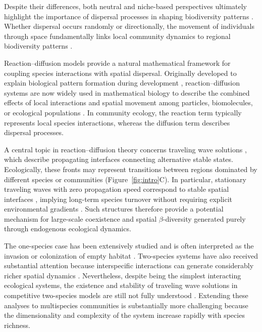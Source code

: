 Despite their differences, both neutral and niche-based perspectives ultimately highlight the importance of dispersal processes in shaping biodiversity patterns \citep{holmes_partial_1994,amarasekare_competitive_2003}. Whether dispersal occurs randomly or directionally, the movement of individuals through space fundamentally links local community dynamics to regional biodiversity patterns \citep{gurtin_mathematical_1974,gude_bacterial_2020}.



Reaction--diffusion models provide a natural mathematical framework for coupling species interactions with spatial dispersal. Originally developed to explain biological pattern formation during development \citep{turing_chemical_1990}, reaction--diffusion systems are now widely used in mathematical biology to describe the combined effects of local interactions and spatial movement among particles, biomolecules, or ecological populations \citep{kondo_reaction-diffusion_2010}. In community ecology, the reaction term typically represents local species interactions, whereas the diffusion term describes dispersal processes.

A central topic in reaction--diffusion theory concerns traveling wave solutions \citep{fife_approach_1977,gardner_existence_1982, hou_traveling_2008, wang_existence_2024}, which describe propagating interfaces connecting alternative stable states. Ecologically, these fronts may represent transitions between regions dominated by different species or communities (Figure~\ref{fig:intro}C). In particular, stationary traveling waves with zero propagation speed correspond to stable spatial interfaces \citep{tuckwell_solitons_1979}, implying long-term species turnover without requiring explicit environmental gradients \citep{namba_spatial_1980,carrere_spreading_2018}. Such structures therefore provide a potential mechanism for large-scale coexistence and spatial $\beta$-diversity generated purely through endogenous ecological dynamics.

The one-species case has been extensively studied and is often interpreted as the invasion or colonization of empty habitat \citep{holmes_partial_1994}. Two-species systems have also received substantial attention because interspecific interactions can generate considerably richer spatial dynamics \citep{pao_coexistence_1981, carrere_spreading_2018,ma_speed_2019,wang_asymptotic_2022}. Nevertheless, despite being the simplest interacting ecological systems, the existence and stability of traveling wave solutions in competitive two-species models are still not fully understood \citep{hou_traveling_2008}. Extending these analyses to multispecies communities is substantially more challenging because the dimensionality and complexity of the system increase rapidly with species richness.

